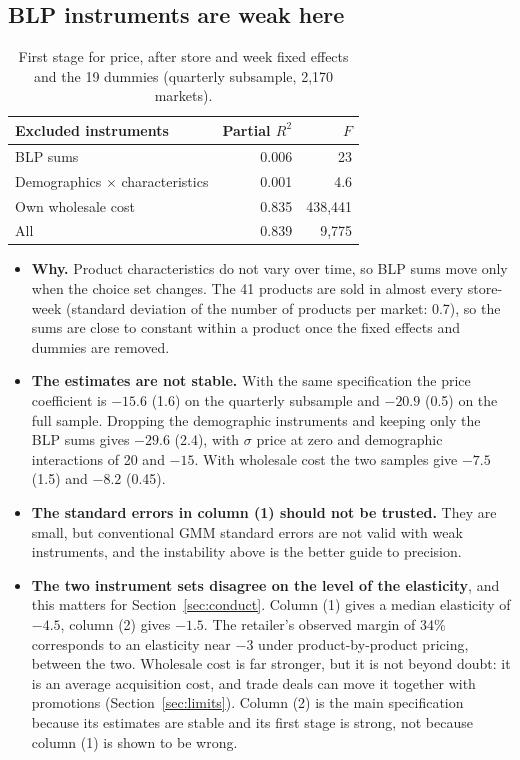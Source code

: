 \documentclass[11pt]{article}
\begin{document}
\subsection{BLP instruments are weak here}

\begin{table}[h!]
\centering\small
\begin{tabular}{@{}lrr@{}}
\toprule
Excluded instruments & Partial $R^2$ & $F$ \\
\midrule
BLP sums                               & 0.006 & 23 \\
Demographics $\times$ characteristics  & 0.001 & 4.6 \\
Own wholesale cost                     & 0.835 & 438,441 \\
All                                    & 0.839 & 9,775 \\
\bottomrule
\end{tabular}
\caption{First stage for price, after store and week fixed effects and the 19 dummies
(quarterly subsample, 2,170 markets).}\label{tab:firststage}
\end{table}

\begin{itemize}
  \item \textbf{Why.} Product characteristics do not vary over time, so BLP sums move only
        when the choice set changes. The 41 products are sold in almost every store-week
        (standard deviation of the number of products per market: 0.7), so the sums are close
        to constant within a product once the fixed effects and dummies are removed.
  \item \textbf{The estimates are not stable.} With the same specification the price
        coefficient is $-15.6$ (1.6) on the quarterly subsample and $-20.9$ (0.5) on the full
        sample. Dropping the demographic instruments and keeping only the BLP sums gives
        $-29.6$ (2.4), with $\sigma$ price at zero and demographic interactions of 20 and
        $-15$. With wholesale cost the two samples give $-7.5$ (1.5) and $-8.2$ (0.45).
  \item \textbf{The standard errors in column (1) should not be trusted.} They are small,
        but conventional GMM standard errors are not valid with weak instruments, and the
        instability above is the better guide to precision.
  \item \textbf{The two instrument sets disagree on the level of the elasticity}, and this
        matters for Section~\ref{sec:conduct}. Column (1) gives a median elasticity of
        $-4.5$, column (2) gives $-1.5$. The retailer's observed margin of 34\% corresponds
        to an elasticity near $-3$ under product-by-product pricing, between the two.
        Wholesale cost is far stronger, but it is not beyond doubt: it is an average
        acquisition cost, and trade deals can move it together with promotions
        (Section~\ref{sec:limits}). Column (2) is the main specification because its
        estimates are stable and its first stage is strong, not because column (1) is shown
        to be wrong.
\end{itemize}
\end{document}
